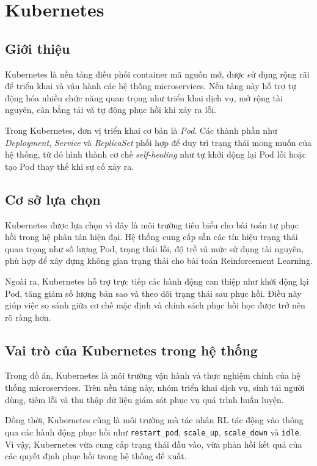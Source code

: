 \section{Kubernetes}

\subsection{Giới thiệu}

Kubernetes là nền tảng điều phối container mã nguồn mở, được sử dụng 
rộng rãi để triển khai và vận hành các hệ thống microservices. Nền 
tảng này hỗ trợ tự động hóa nhiều chức năng quan trọng như triển khai 
dịch vụ, mở rộng tài nguyên, cân bằng tải và tự động phục hồi khi xảy 
ra lỗi.

Trong Kubernetes, đơn vị triển khai cơ bản là \textit{Pod}. Các thành phần như \textit{Deployment}, \textit{Service} và \textit{ReplicaSet} phối hợp để duy trì trạng thái mong muốn của hệ thống, từ đó hình thành cơ chế \textit{self-healing} như tự khởi động lại Pod lỗi hoặc tạo Pod thay thế khi sự cố xảy ra.

\subsection{Cơ sở lựa chọn}

Kubernetes được lựa chọn vì đây là môi trường tiêu biểu cho bài toán tự phục hồi trong hệ phân tán hiện đại. Hệ thống cung cấp sẵn các tín hiệu trạng thái quan trọng như số lượng Pod, trạng thái lỗi, độ trễ và mức sử dụng tài nguyên, phù hợp để xây dựng không gian trạng thái cho bài toán Reinforcement Learning.

Ngoài ra, Kubernetes hỗ trợ trực tiếp các hành động can thiệp như khởi động lại Pod, tăng giảm số lượng bản sao và theo dõi trạng thái sau phục hồi. Điều này giúp việc so sánh giữa cơ chế mặc định và chính sách phục hồi học được trở nên rõ ràng hơn.

\subsection{Vai trò của Kubernetes trong hệ thống}

Trong đồ án, Kubernetes là môi trường vận hành và thực nghiệm chính của hệ thống microservices. Trên nền tảng này, nhóm triển khai dịch vụ, sinh tải người dùng, tiêm lỗi và thu thập dữ liệu giám sát phục vụ quá trình huấn luyện.

Đồng thời, Kubernetes cũng là môi trường mà tác nhân RL tác động vào thông qua các hành động phục hồi như \texttt{restart\_pod}, \texttt{scale\_up}, \texttt{scale\_down} và \texttt{idle}. Vì vậy, Kubernetes vừa cung cấp trạng thái đầu vào, vừa phản hồi kết quả của các quyết định phục hồi trong hệ thống đề xuất.

